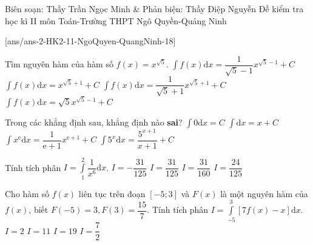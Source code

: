 
\begin{name}
{Biên soạn: Thầy Trần Ngọc Minh \& Phản biện: Thầy Điệp Nguyễn}
{Đề kiểm tra học kì II môn Toán-Trường THPT Ngô Quyền-Quảng Ninh}
\end{name}
\setcounter{ex}{0}\setcounter{bt}{0}
[ans/ans-2-HK2-11-NgoQuyen-QuangNinh-18]
\begin{ex}%
	Tìm nguyên hàm của hàm số $f(x)= x^{\sqrt{5}}$.
	\choice
	{$\displaystyle \int f(x) \mathrm{d} x = \dfrac{1}{\sqrt{5}-1}x^{\sqrt{5}-1} + C$}
	{$\displaystyle \int f(x) \mathrm{d} x = x^{\sqrt{5}+1}+C$}
	{\True $\displaystyle \int f(x) \mathrm{d} x = \dfrac{1}{\sqrt{5}+1}x^{\sqrt{5}+1}+C$}
	{$\displaystyle \int f(x) \mathrm{d} x = \sqrt{5}x^{\sqrt{5}-1}+ C$}
\end{ex}

\begin{ex}%
	Trong các khẳng định sau, khẳng định nào \textbf{sai}?
	\choice
	{$\displaystyle \int 0 \mathrm{d} x = C$}
	{$\displaystyle \int \mathrm{d} x = x + C$}
	{$\displaystyle \int x^{\mathrm{e}} \mathrm{d} x = \dfrac{1}{\mathrm{e}+1}x^{\mathrm{e}+1}+C$}
	{\True $\displaystyle \int 5^x \mathrm{d} x = \dfrac{5^{x+1}}{x+1}+ C$}
\end{ex}

\begin{ex}%
	Tính tích phân $I = \displaystyle \int \limits_{1}^{2} \dfrac{1}{x^6} \mathrm{d} x$.
	\choice
	{$I = -\dfrac{31}{125}$}
	{$I = \dfrac{31}{125}$}
	{\True $I = \dfrac{31}{160}$}
	{$I = \dfrac{24}{125}$}
\end{ex}

\begin{ex}%
	Cho hàm số $f(x)$ liên tục trên đoạn $[-5;3]$ và $F(x)$ là một nguyên hàm của $f(x)$, biết $F(-5)=3, F(3)=\dfrac{15}{7}$. Tính tích phân $I=\displaystyle \int \limits_{-5}^{3}\left[7f(x)-x\right] \mathrm{d} x$.
	\choice
	{\True $I = 2$}
	{$I = 11$}
	{ $I = 19$}
	{$I = \dfrac{7}{2}$}
\end{ex}


